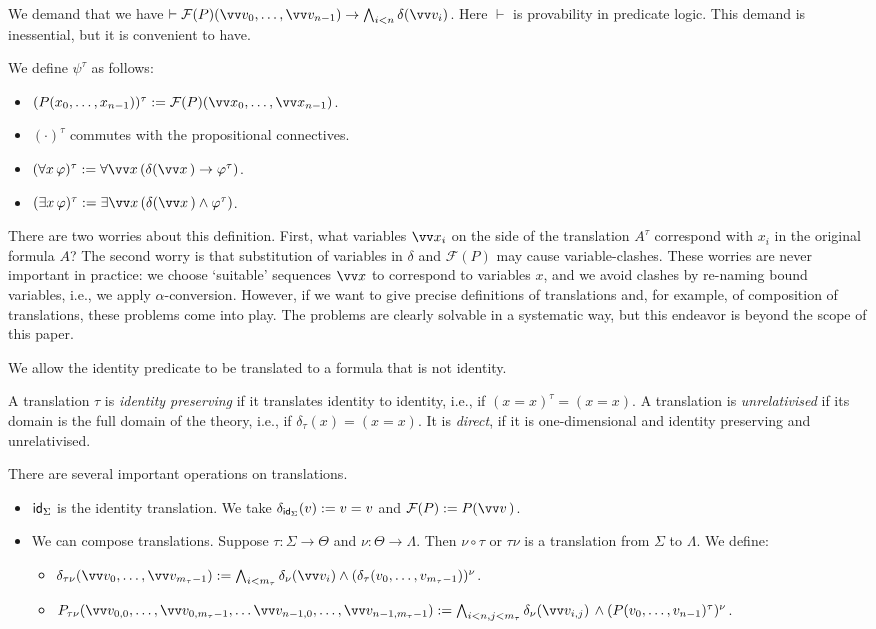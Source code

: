 \documentclass{amsart}
\renewcommand{\phi}{\varphi}
\renewcommand{\Theta}{\varTheta}
\begin{document}
We demand that we have $\vdash {\mathcal F}(P)(\vv v_0,\ldots, \vv v_{n-1}) \to \bigwedge_{i<n} \delta(\vv v_i)$.
Here $\vdash$ is provability in predicate logic. This demand is inessential, but it is convenient to have.

We define $\psi^\tau$ as follows:
\begin{itemize}
\item
$(P(x_0,\ldots,x_{n-1}))^\tau :=  \mathcal F(P)(\vv x_0,\ldots, \vv x_{n-1})$.
\item
$(\cdot)^\tau$ commutes with the propositional connectives.
\item
$(\forall x\, \phi)^\tau := \forall \vv x \,( \delta(\vv x\,) \to \phi^\tau)$.
\item
$(\exists x\, \phi)^\tau := \exists \vv x \,( \delta(\vv x\,) \wedge \phi^\tau)$.
\end{itemize}
%
There are two worries about this definition. 
First, what variables $\vv x_i$ on the side of the translation $A^\tau$
correspond with $x_i$ in the original formula $A$? 
 The second worry is that  substitution of variables in $\delta$
and $\mathcal F(P)$ may cause variable-clashes.
These worries are never important in practice: we choose
 `suitable' sequences $\vv x$ to correspond to variables $x$, and we avoid clashes by re-naming bound variables, i.e., we apply $\alpha$-conversion. 
 However, if we want to give precise definitions of translations and, for example, of composition of translations, these
 problems come into play. The problems are clearly solvable in a systematic way, but this endeavor is beyond the scope of this paper.
 
 We allow the identity predicate to be translated to a formula that is not identity.
 

 A translation $\tau$ is \emph{identity preserving} if it translates identity to identity, i.e., if $(x=x)^\tau = (x=x)$. A translation is \emph{unrelativised}
 if its domain is the full domain of the theory, i.e., if $\delta_\tau(x) = (x=x)$.
 It is \emph{direct}, if it is one-dimensional and identity preserving and unrelativised.

There are several important operations on translations. 
\begin{itemize}
\item
${\sf id}_\Sigma$ is the identity translation. We take $\delta_{{\sf id}_\Sigma}(v) := v=v$ and $\mathcal F(P) := P(\vv v\,)$.
\item
We can compose translations. Suppose $\tau:\Sigma\to \Theta$ and $\nu:\Theta \to \Lambda$.
Then $\nu\circ \tau$ or $\tau\nu$ is a translation from $\Sigma$ to $\Lambda$. We define:
\begin{itemize}
\item
$\delta_{\tau\nu}(\vv v_0,\ldots,\vv v_{m_\tau-1}) := \bigwedge_{i< m_\tau}\delta_\nu(\vv v_i) \wedge (\delta_\tau(v_0,\ldots,v_{m_\tau-1}))^\nu$.
\item
$P_{\tau\nu}(\vv v_{0,0},\ldots,\vv v_{0,m_\tau-1},\ldots \vv v_{n-1,0},\ldots,\vv v_{n-1,m_\tau-1}) := \\
{\bigwedge_{i<n, j< m_\tau} \delta_\nu(\vv v_{i,j})}\, \wedge (P(v_0,\ldots, v_{n-1})^\tau)^\nu $.
\end{itemize}
\end{itemize}
\end{document}
